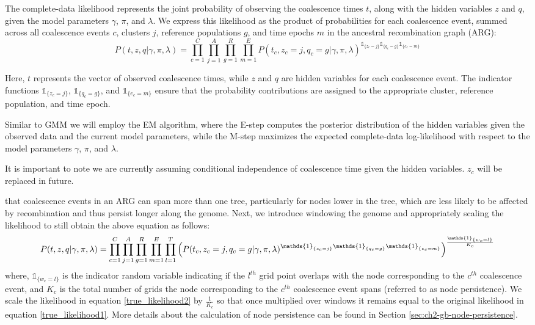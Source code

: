 The complete-data likelihood represents the joint probability of observing the coalescence times \( t \), along with the hidden variables \( z \) and \( q \), given the model parameters \( \gamma \), \( \pi \), and \( \lambda \). We express this likelihood as the product of probabilities for each coalescence event, summed across all coalescence events \( c \), clusters \( j \), reference populations \( g \), and time epochs \( m \) in the ancestral recombination graph (ARG):
\begin{equation}
    P (t,z,q \vert \gamma, \pi, \lambda) = \prod_{c=1}^{C} \prod_{j = 1}^A \prod_{g =1}^{R} \prod_{m = 1}^E P (t_c,z_c = j,q_c=g \vert \gamma, \pi, \lambda)^{\mathds{1}_{\{z_c = j\}} \mathds{1}_{\{q_c = g\}} \mathds{1}_{\{e_c = m\}}}
\label{true_likelihood1}
\end{equation}

Here, \( t \) represents the vector of observed coalescence times, while \( z \) and \( q \) are hidden variables for each coalescence event. The indicator functions \( \mathds{1}_{\{z_c = j\}} \), \( \mathds{1}_{\{q_c = g\}} \), and \( \mathds{1}_{\{e_c = m\}} \) ensure that the probability contributions are assigned to the appropriate cluster, reference population, and time epoch. 

Similar to GMM we will employ the EM algorithm, where the E-step computes the posterior distribution of the hidden variables given the observed data and the current model parameters, while the M-step maximizes the expected complete-data log-likelihood with respect to the model parameters \( \gamma \), \( \pi \), and \( \lambda \). 


It is important to note we are currently assuming conditional independence of coalescence time given the hidden variables. $z_c$ will be replaced in future.  

that coalescence events in an ARG can span more than one tree, particularly for nodes lower in the tree, which are less likely to be affected by recombination and thus persist longer along the genome. Next, we introduce windowing the genome and appropriately scaling the likelihood to still obtain the above equation as follows:
\begin{equation}
    \footnotesize
    P(t,z,q \vert \gamma, \pi, \lambda) = \prod_{c=1}^{C} \prod_{j = 1}^A \prod_{g =1}^{R} \prod_{m = 1}^E \prod_{l =1}^{T} \left( P(t_c,z_c = j,q_c=g \vert \gamma, \pi, \lambda)^{\mathds{1}_{\{z_c = j\}} \mathds{1}_{\{q_c = g\}} \mathds{1}_{\{e_c = m\}}} \right) ^{\frac{\mathds{1}_{\{w_c = l\}}}{K_c}}
\label{true_likelihood2}
\end{equation}
where, $\mathds{1}_{\{w_c = l\}}$ is the indicator random variable indicating if the $l^{th}$ grid point overlaps with the node corresponding to the $c^{th}$ coalescence event, and $K_c$ is the total number of grids the node corresponding to the $c^{th}$ coalescence event spans (referred to as node persistence). We scale the likelihood in equation \ref{true_likelihood2} by $\frac{1}{K_c}$ so that once multiplied over windows it remains equal to the original likelihood in equation \ref{true_likelihood1}. More details about the calculation of node persistence can be found in Section \ref{sec:ch2-gb-node-persistence}.

